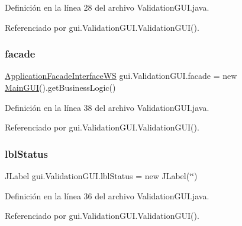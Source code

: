 Definición en la línea 28 del archivo Validation\+G\+U\+I.\+java.



Referenciado por gui.\+Validation\+G\+U\+I.\+Validation\+G\+U\+I().

\mbox{\label{classgui_1_1_validation_g_u_i_af2cb3e3d7bab33150dca01f640cdb824}} 
\subsubsection{\texorpdfstring{facade}{facade}}
{\footnotesize\ttfamily \mbox{\hyperlink{interfacebusiness_logic_1_1_application_facade_interface_w_s}{Application\+Facade\+Interface\+WS}} gui.\+Validation\+G\+U\+I.\+facade = new \mbox{\hyperlink{classgui_1_1_main_g_u_i}{Main\+G\+UI}}().get\+Business\+Logic()\hspace{0.3cm}{\ttfamily [private]}}



Definición en la línea 38 del archivo Validation\+G\+U\+I.\+java.



Referenciado por gui.\+Validation\+G\+U\+I.\+Validation\+G\+U\+I().

\mbox{\label{classgui_1_1_validation_g_u_i_ae54db9df71d22bf4b59706bdab55511b}} 
\subsubsection{\texorpdfstring{lblStatus}{lblStatus}}
{\footnotesize\ttfamily J\+Label gui.\+Validation\+G\+U\+I.\+lbl\+Status = new J\+Label(\char`\"{}\char`\"{})\hspace{0.3cm}{\ttfamily [private]}}



Definición en la línea 36 del archivo Validation\+G\+U\+I.\+java.



Referenciado por gui.\+Validation\+G\+U\+I.\+Validation\+G\+U\+I().

\mbox{\label{classgui_1_1_validation_g_u_i_a863272c906d3d0db5e2d015d0793fe0a}} 
